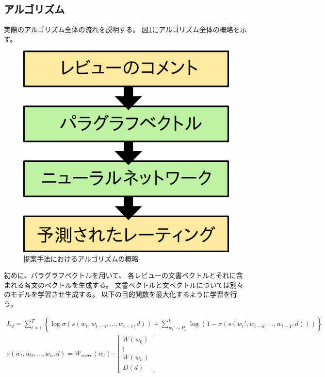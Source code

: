 \documentclass{ttithesis}
\begin{document}
\subsection{アルゴリズム}

実際のアルゴリズム全体の流れを説明する。
図\ref{fig:MyAlgorithm}にアルゴリズム全体の概略を示す。

\begin{figure}
  \includegraphics{fig/algorithm.png}
  \caption{提案手法におけるアルゴリズムの概略}
  \label{fig:MyAlgorithm}
\end{figure}

初めに、パラグラフベクトルを用いて、
各レビューの文書ベクトルとそれに含まれる各文のベクトルを生成する。
文書ベクトルと文ベクトルについては別々のモデルを学習させ生成する。
以下の目的関数を最大化するように学習を行う。

\begin{gather}
  L_d = \sum^{T}_{t = 1} \left\{ \log \sigma(s(w_t, w_{t-n}, ..., w_{t-1}, d))
        + \sum^{k}_{w_{t}' \sim P_n}
          \log(1 - \sigma(s(w_{t}', w_{t-n}, ..., w_{t-1}, d))) \right\}
  \label{eq:ObjectiveFunction} \\
  s(w_t, w_0, ..., w_n, d)
    = W_{score}(w_t)
      \cdot \begin{bmatrix} W(w_0) \\ \vdots \\ W(w_n) \\ D(d) \end{bmatrix}
\end{gather}
\end{document}
